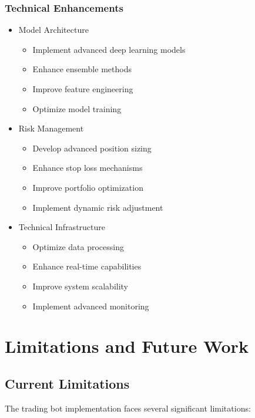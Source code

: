 \documentclass[conference]{IEEEtran}
\begin{document}
\subsubsection{Technical Enhancements}
\begin{itemize}
    \item Model Architecture
    \begin{itemize}
        \item Implement advanced deep learning models
        \item Enhance ensemble methods
        \item Improve feature engineering
        \item Optimize model training
    \end{itemize}
    
    \item Risk Management
    \begin{itemize}
        \item Develop advanced position sizing
        \item Enhance stop loss mechanisms
        \item Improve portfolio optimization
        \item Implement dynamic risk adjustment
    \end{itemize}
    
    \item Technical Infrastructure
    \begin{itemize}
        \item Optimize data processing
        \item Enhance real-time capabilities
        \item Improve system scalability
        \item Implement advanced monitoring
    \end{itemize}
\end{itemize}

\section{Limitations and Future Work}
\subsection{Current Limitations}
The trading bot implementation faces several significant limitations:
\end{document}
